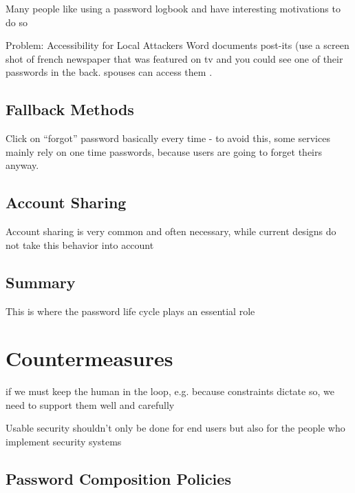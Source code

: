 	Many people like using a password logbook and have interesting motivations to do so \cite{Kothari2017PasswordLogbooks}
	
	\cite{Conklin2004PWAuthenticationSystemPerspective}
	
	Problem: Accessibility for Local Attackers
Word documents post-its (use a screen shot of french newspaper that was featured on tv and you could see one of their passwords in the back. spouses can access them .	


	\subsection{Fallback Methods}
	Click on ``forgot'' password basically every time - to avoid this, some services mainly rely on one time passwords, because users are going to forget theirs anyway. 

	\cite{Bonneau2015SecretsLies}
	


	\subsection{Account Sharing}
	Account sharing is very common and often necessary, while current designs do not take this behavior into account \cite{Singh2007PasswordSharing}

	\subsection{Summary}
	This is where the password life cycle plays an essential role \cite{Stobert2014PasswordLifeCycle}

\section{Countermeasures}

if we must keep the human in the loop, e.g. because constraints dictate so, we need to support them well and carefully \cite{Cranor2008FrameworkReasoning}

Usable security shouldn't only be done for end users but also for the people who implement security systems \cite{Acar2016NotYourDeveloper}


	\subsection{Password Composition Policies}\label{sec:rw:policies}
	

